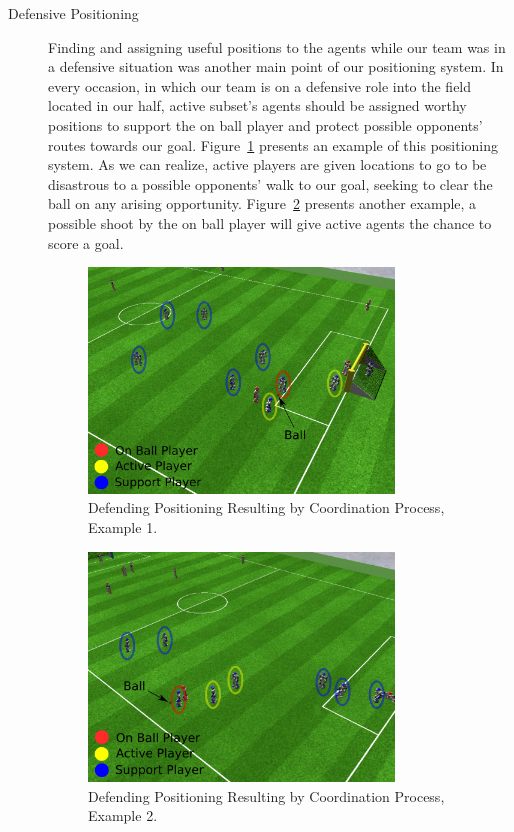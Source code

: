 \begin{description}
\item[Defensive Positioning]
Finding and assigning useful positions to the agents while our team was in a defensive situation was another main point of our positioning system. In every occasion, in which our team is on a defensive role into the field located in our half, active subset's agents should be assigned worthy positions to support the on ball player and protect possible opponents' routes towards our goal. Figure~\ref{fig:DefendingPositioning} presents an example of this positioning system. As we can realize, active players are given locations to go to be disastrous to a possible opponents' walk to our goal, seeking to clear the ball on any arising opportunity. Figure~\ref{fig:DefendingPositioning1} presents another example, a possible shoot by the on ball player will give active agents the chance to score a goal.


\begin{figure}[h!]
\centering
  \includegraphics[width=0.8\textwidth]{Chapter5/figures/1.pdf}
  \caption{Defending Positioning Resulting by Coordination Process, Example 1.} 
  \label{fig:DefendingPositioning}
\end{figure}


\begin{figure}[h!]
\centering
  \includegraphics[width=0.8\textwidth]{Chapter5/figures/2.pdf}
  \caption{Defending Positioning Resulting by Coordination Process, Example 2.} 
  \label{fig:DefendingPositioning1}
\end{figure}


\end{description}
